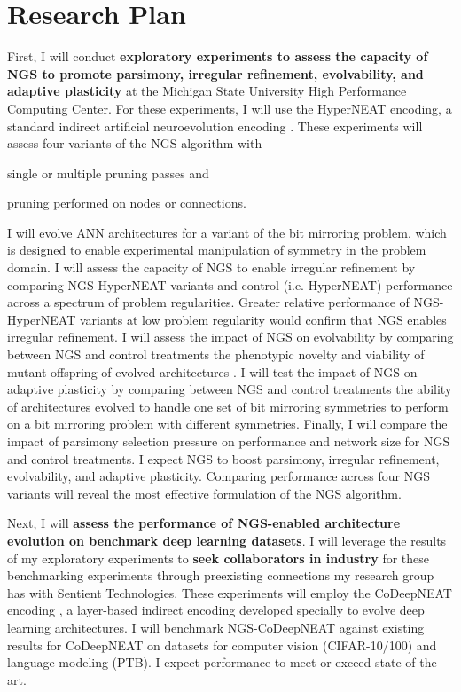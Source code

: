 \section{Research Plan}

First, I will conduct \textbf{exploratory experiments to assess the capacity of NGS to promote parsimony, irregular refinement, evolvability, and adaptive plasticity} at the Michigan State University High Performance Computing Center.
For these experiments, I will use the HyperNEAT encoding, a standard indirect artificial neuroevolution encoding \cite{clune2011performance}.
These experiments will assess four variants of the NGS algorithm with
\begin{enumerate*}[label=(\alph*)]
\item single or multiple pruning passes and
\item pruning performed on nodes or connections.
\end{enumerate*}
I will evolve ANN architectures for a variant of the bit mirroring problem, which is designed to enable experimental manipulation of symmetry in the problem domain.
I will assess the capacity of NGS to enable irregular refinement by comparing NGS-HyperNEAT variants and control (i.e. HyperNEAT) performance across a spectrum of problem regularities.
Greater relative performance of NGS-HyperNEAT variants at low problem regularity would confirm that NGS enables irregular refinement.
I will assess the impact of NGS on evolvability by comparing between NGS and control treatments the phenotypic novelty and viability of mutant offspring of evolved architectures \cite{tarapore2015evolvability}.
I will test the impact of NGS on adaptive plasticity by comparing between NGS and control treatments the ability of architectures evolved to handle one set of bit mirroring symmetries to perform on a bit mirroring problem with different symmetries.
Finally, I will compare the impact of parsimony selection pressure on performance and network size for NGS and control treatments.
I expect NGS to boost parsimony, irregular refinement, evolvability, and adaptive plasticity.
Comparing performance across four NGS variants will reveal the most effective formulation of the NGS algorithm.

Next, I will \textbf{assess the performance of NGS-enabled architecture evolution on benchmark deep learning datasets}.
I will leverage the results of my exploratory experiments to \textbf{seek collaborators in industry} for these benchmarking experiments through preexisting connections my research group has with Sentient Technologies.
These experiments will employ the CoDeepNEAT encoding \cite{miikkulainen2017evolving}, a layer-based indirect encoding developed specially to evolve deep learning architectures.
I will benchmark NGS-CoDeepNEAT against existing results for CoDeepNEAT on datasets for computer vision (CIFAR-10/100) and language modeling (PTB).
I expect performance to meet or exceed state-of-the-art.
